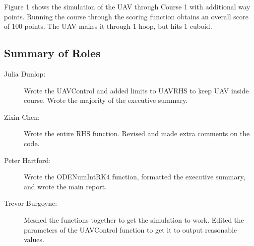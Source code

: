 \documentclass[12pt]{article}
\begin{document}
Figure 1 shows the simulation of the UAV through Course 1 with additional way points. Running the course through the scoring function obtains an overall score of 100 points. The UAV makes it through 1 hoop, but hits 1 cuboid. 	




\pagebreak
\subsection*{\centering Summary of Roles}  

\begin{description}
\item[Julia Dunlop:] Wrote the UAVControl and added limits to UAVRHS to keep UAV inside course. Wrote the majority of the executive summary. 

\item[Zixin Chen:] Wrote the entire RHS function. Revised and made extra comments on the code.

\item[Peter Hartford:] Wrote the ODENumIntRK4 function, formatted the executive summary, and wrote the main report. 

\item[Trevor Burgoyne:] Meshed the functions together to get the simulation to work. Edited the parameters of the UAVControl function to get it to output reasonable values.

\end{description}

\pagebreak  
\end{document}
